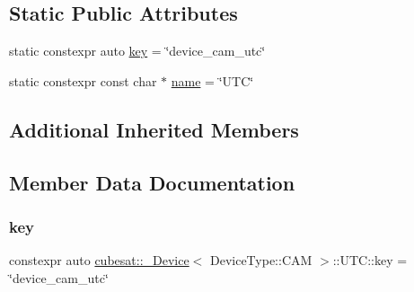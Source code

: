 \subsection*{Static Public Attributes}
\begin{DoxyCompactItemize}
\item 
static constexpr auto \hyperlink{structcubesat_1_1__Device_3_01DeviceType_1_1CAM_01_4_1_1UTC_acde3e97777c4866d82a5ac0e458f1ece}{key} = \char`\"{}device\+\_\+cam\+\_\+utc\char`\"{}
\item 
static constexpr const char $\ast$ \hyperlink{structcubesat_1_1__Device_3_01DeviceType_1_1CAM_01_4_1_1UTC_ab049c46735b80ef5f1fd19b1c3dfda71}{name} = \char`\"{}U\+TC\char`\"{}
\end{DoxyCompactItemize}
\subsection*{Additional Inherited Members}


\subsection{Member Data Documentation}
\mbox{\label{structcubesat_1_1__Device_3_01DeviceType_1_1CAM_01_4_1_1UTC_acde3e97777c4866d82a5ac0e458f1ece}} 
\subsubsection{\texorpdfstring{key}{key}}
{\footnotesize\ttfamily constexpr auto \hyperlink{structcubesat_1_1__Device}{cubesat\+::\+\_\+\+Device}$<$ Device\+Type\+::\+C\+AM $>$\+::U\+T\+C\+::key = \char`\"{}device\+\_\+cam\+\_\+utc\char`\"{}\hspace{0.3cm}{\ttfamily [static]}}

\mbox{\label{structcubesat_1_1__Device_3_01DeviceType_1_1CAM_01_4_1_1UTC_ab049c46735b80ef5f1fd19b1c3dfda71}} 
